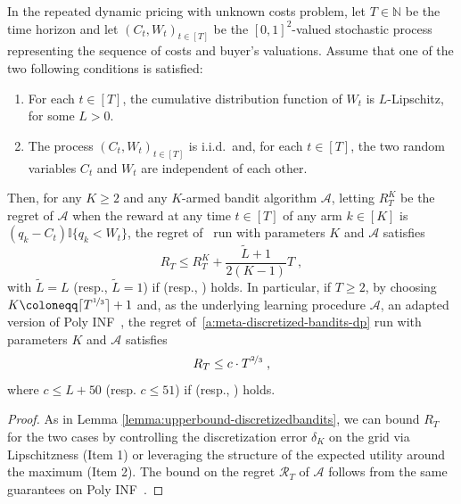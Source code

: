 \documentclass[final,12pt]{colt2025}
\newcommand{\cA}{\mathcal{A}}
\newcommand{\cR}{\mathcal{R}}
\newcommand{\N}{\mathbb{N}}
\newcommand{\one}[1]{\mathbb{I}\{#1\}}
\newcommand{\nC}{C}
\newcommand{\nW}{W}
\renewcommand{\tilde}{\widetilde}
\begin{document}
\begin{lemma}\label{lemma:upperbound-discretizedbandits-dp}
    In the repeated dynamic pricing with unknown costs problem,
    let $T \in \N$ be the time horizon and let $( \nC_t, \nW_t )_{t \in [T]}$ be the $[0,1]^2$-valued stochastic process representing the sequence of costs and buyer's valuations. 
    Assume that one of the two following conditions is satisfied:
    \begin{enumerate}
        \item \label{t:assOne}
        For each $t \in [T]$, the cumulative distribution function of $\nW_t$ is $L$-Lipschitz, for some $L>0$. 
        \item \label{t:assTwo}
        The process $( \nC_t , \nW_t )_{t \in [T]}$ is i.i.d.\ and, for each $t \in [T]$, the two random variables $\nC_t$ and $\nW_t$ are independent of each other.
    \end{enumerate}
    Then, for any $K \ge 2$ and any $K$-armed bandit algorithm $\cA$, letting $R^K_T$ be the regret of $\cA$ when the reward at any time $t\in[T]$ of any arm $k\in[K]$ is $(q_k - \nC_t)\one{q_k < \nW_t}$,
    the regret of~ run with parameters $K$ and $\cA$ satisfies
    \[
        R_T
    \le
        R_T^K + \frac{\tilde L + 1}{2(K-1)} T \;,
    \]
    with $\tilde L = L$ (resp., $\tilde L = 1$) if  (resp., ) holds. In particular, if $T \ge 2$, by choosing $K \coloneqq \lceil T^{\nicefrac{1}{3}} \rceil + 1$ and, as the underlying learning procedure $\cA$, an adapted version of Poly INF~\citep{audibert10a}, the regret of~\cref{a:meta-discretized-bandits-dp} run with parameters $K$ and $\cA$ satisfies
    \[
        R_T \le c \cdot T^{\nicefrac{2}{3}} \;,
    \] where $c \le L + 50$ (resp. $c \le 51$) if  (resp., ) holds.
\end{lemma}
\begin{proof}
    As in Lemma \ref{lemma:upperbound-discretizedbandits}, we can bound $R_T$ for the two cases by controlling the discretization error $\delta_K$ on the grid via Lipschitzness (Item 1) or leveraging the structure of the expected utility around the maximum (Item 2). The bound on the regret $\cR_T$ of $\cA$ follows from the same guarantees on Poly INF~\citep{audibert10a}.
\end{proof}
\end{document}
